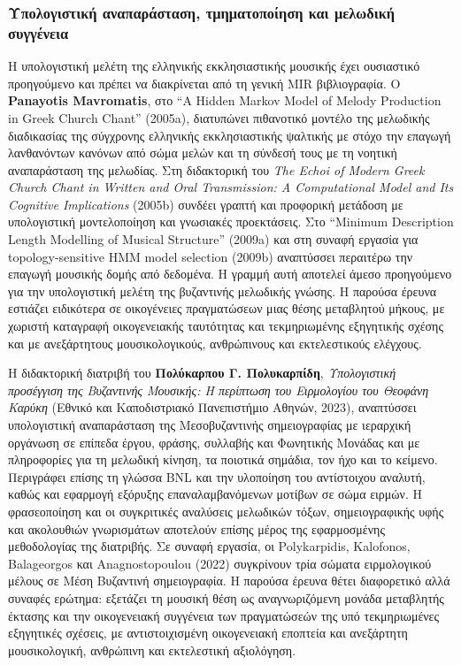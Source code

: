 \documentclass[11pt,a4paper]{article}
\begin{document}
\subsubsection{Υπολογιστική αναπαράσταση, τμηματοποίηση και μελωδική συγγένεια}

Η υπολογιστική μελέτη της ελληνικής εκκλησιαστικής μουσικής έχει ουσιαστικό προηγούμενο και πρέπει να διακρίνεται από τη γενική MIR βιβλιογραφία. Ο \textbf{Panayotis Mavromatis}, στο ``A Hidden Markov Model of Melody Production in Greek Church Chant'' (2005a), διατυπώνει πιθανοτικό μοντέλο της μελωδικής διαδικασίας της σύγχρονης ελληνικής εκκλησιαστικής ψαλτικής με στόχο την επαγωγή λανθανόντων κανόνων από σώμα μελών και τη σύνδεσή τους με τη νοητική αναπαράσταση της μελωδίας. Στη διδακτορική του \emph{The Echoi of Modern Greek Church Chant in Written and Oral Transmission: A Computational Model and Its Cognitive Implications} (2005b) συνδέει γραπτή και προφορική μετάδοση με υπολογιστική μοντελοποίηση και γνωσιακές προεκτάσεις. Στο ``Minimum Description Length Modelling of Musical Structure'' (2009a) και στη συναφή εργασία για topology-sensitive HMM model selection (2009b) αναπτύσσει περαιτέρω την επαγωγή μουσικής δομής από δεδομένα. Η γραμμή αυτή αποτελεί άμεσο προηγούμενο για την υπολογιστική μελέτη της βυζαντινής μελωδικής γνώσης. Η παρούσα έρευνα εστιάζει ειδικότερα σε οικογένειες πραγματώσεων μιας θέσης μεταβλητού μήκους, με χωριστή καταγραφή οικογενειακής ταυτότητας και τεκμηριωμένης εξηγητικής σχέσης και με ανεξάρτητους μουσικολογικούς, ανθρώπινους και εκτελεστικούς ελέγχους.

Η διδακτορική διατριβή του \textbf{Πολύκαρπου Γ. Πολυκαρπίδη}, \emph{Υπολογιστική προσέγγιση της Βυζαντινής Μουσικής: Η περίπτωση του Ειρμολογίου του Θεοφάνη Καρύκη} (Εθνικό και Καποδιστριακό Πανεπιστήμιο Αθηνών, 2023), αναπτύσσει υπολογιστική αναπαράσταση της Μεσοβυζαντινής σημειογραφίας με ιεραρχική οργάνωση σε επίπεδα έργου, φράσης, συλλαβής και Φωνητικής Μονάδας και με πληροφορίες για τη μελωδική κίνηση, τα ποιοτικά σημάδια, τον ήχο και το κείμενο. Περιγράφει επίσης τη γλώσσα BNL και την υλοποίηση του αντίστοιχου αναλυτή, καθώς και εφαρμογή εξόρυξης επαναλαμβανόμενων μοτίβων σε σώμα ειρμών. Η φρασεοποίηση και οι συγκριτικές αναλύσεις μελωδικών τόξων, σημειογραφικής υφής και ακολουθιών γνωρισμάτων αποτελούν επίσης μέρος της εφαρμοσμένης μεθοδολογίας της διατριβής. Σε συναφή εργασία, οι Polykarpidis, Kalofonos, Balageorgos και Anagnostopoulou (2022) συγκρίνουν τρία σώματα ειρμολογικού μέλους σε Μέση Βυζαντινή σημειογραφία. Η παρούσα έρευνα θέτει διαφορετικό αλλά συναφές ερώτημα: εξετάζει τη μουσική θέση ως αναγνωριζόμενη μονάδα μεταβλητής έκτασης και την οικογενειακή συγγένεια των πραγματώσεών της υπό τεκμηριωμένες εξηγητικές σχέσεις, με αντιστοιχισμένη οικογενειακή εποπτεία και ανεξάρτητη μουσικολογική, ανθρώπινη και εκτελεστική αξιολόγηση.
\end{document}
